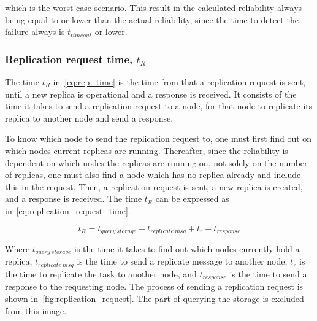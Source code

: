 \documentclass{cslthse-msc}
\begin{document}
which is the worst case scenario. This result in the calculated reliability always being equal to or lower than the actual reliability, since the time to detect the failure always is $t_{timeout}$ or lower.

\subsubsection{Replication request time, $t_R$} \label{sec:replication_time}
The time $t_R$ in~\cref{eq:rep_time} is the time from that a replication request is sent, until a new replica is operational and a response is received. It consists of the time it takes to send a replication request to a node, for that node to replicate its replica to another node and send a response.

To know which node to send the replication request to, one must first find out on which nodes current replicas are running. Thereafter, since the reliability is dependent on which nodes the replicas are running on, not solely on the number of replicas, one must also find a node which has no replica already and include this in the request. Then, a replication request is sent, a new replica is created, and a response is received. The time $t_R$ can be expressed as in~\cref{eq:replication_request_time}.

\begin{equation} \label{eq:replication_request_time}
t_R = t_{query\ storage} + t_{replicate\ msg} + t_{r} + t_{response}
\end{equation} 

Where $t_{query\ storage}$ is the time it takes to find out which nodes currently hold a replica, $t_{replicate\ msg}$ is the time to send a replicate message to another node, $t_{r}$ is the time to replicate the task to another node, and $t_{response}$ is the time to send a response to the requesting node. The process of sending a replication request is shown in~\cref{fig:replication_request}. The part of querying the storage is excluded from this image.
\end{document}

